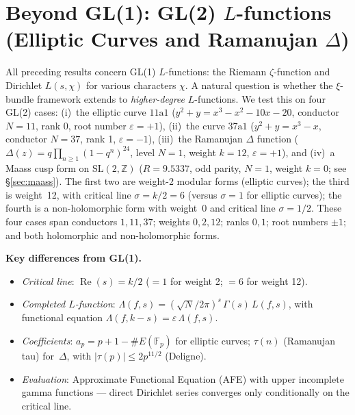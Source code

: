 \documentclass[11pt, a4paper]{article}
\theoremstyle{definition}
\theoremstyle{plain}
\begin{document}
\section{Beyond GL(1): GL(2) $L$-functions (Elliptic Curves and Ramanujan $\Delta$)}
\label{app:gl2}

All preceding results concern GL(1) $L$-functions: the Riemann
$\zeta$-function and Dirichlet $L(s,\chi)$ for various characters $\chi$.
A natural question is whether the $\xi$-bundle framework extends to
\emph{higher-degree} $L$-functions.  We test this on four GL(2)
cases: (i)~the elliptic curve $11\text{a}1$
($y^2 + y = x^3 - x^2 - 10x - 20$, conductor $N = 11$, rank 0,
root number $\varepsilon = +1$), (ii)~the curve $37\text{a}1$
($y^2 + y = x^3 - x$, conductor $N = 37$, rank 1,
$\varepsilon = -1$), (iii)~the Ramanujan $\Delta$ function
($\Delta(z) = q\prod_{n\geq 1}(1-q^n)^{24}$, level $N = 1$,
weight $k = 12$, $\varepsilon = +1$), and (iv)~a Maass cusp form on
$\mathrm{SL}(2,\mathbb{Z})$ ($R = 9.5337$, odd parity, $N = 1$,
weight $k = 0$; see \S\ref{sec:maass}).
The first two are weight-2
modular forms (elliptic curves); the third is weight~12, with
critical line $\sigma = k/2 = 6$ (versus $\sigma = 1$ for
elliptic curves); the fourth is a non-holomorphic form with weight~0
and critical line $\sigma = 1/2$.
These four cases span conductors $1, 11, 37$;
weights $0, 2, 12$; ranks $0, 1$; root numbers $\pm 1$; and both
holomorphic and non-holomorphic forms.

\medskip\noindent
\textbf{Key differences from GL(1).}
\begin{itemize}
  \item \emph{Critical line}: $\operatorname{Re}(s) = k/2$ ($= 1$ for weight 2; $= 6$ for weight 12).
  \item \emph{Completed $L$-function}: $\Lambda(f,s) = (\sqrt{N}/2\pi)^s\,\Gamma(s)\,L(f,s)$,
        with functional equation $\Lambda(f,k-s) = \varepsilon\,\Lambda(f,s)$.
  \item \emph{Coefficients}: $a_p = p + 1 - \#E(\mathbb{F}_p)$ for elliptic curves;
        $\tau(n)$ (Ramanujan tau) for~$\Delta$, with $|\tau(p)| \leq 2p^{11/2}$ (Deligne).
  \item \emph{Evaluation}: Approximate Functional Equation (AFE) with
        upper incomplete gamma functions --- direct Dirichlet series
        converges only conditionally on the critical line.
\end{itemize}
\end{document}
